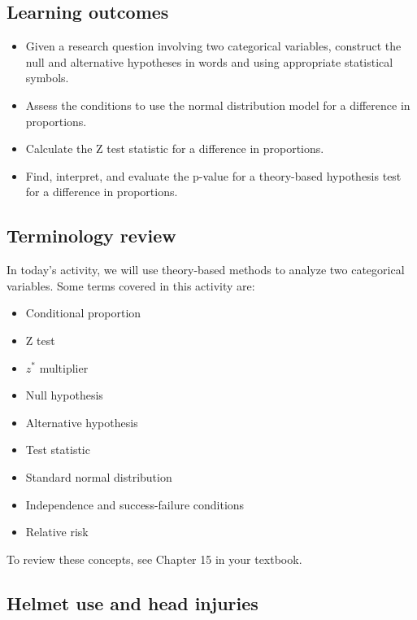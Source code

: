 \documentclass[
]{report}
\begin{document}

\hypertarget{learning-outcomes-17}{%
\subsection{Learning outcomes}\label{learning-outcomes-17}}

\begin{itemize}
\item
  Given a research question involving two categorical variables, construct the null and alternative hypotheses
  in words and using appropriate statistical symbols.
\item
  Assess the conditions to use the normal distribution model for a difference in proportions.
\item
  Calculate the Z test statistic for a difference in proportions.
\item
  Find, interpret, and evaluate the p-value for a theory-based hypothesis test for a difference in proportions.
\end{itemize}

\hypertarget{terminology-review-15}{%
\subsection{Terminology review}\label{terminology-review-15}}

In today's activity, we will use theory-based methods to analyze two categorical variables. Some terms covered in this activity are:

\begin{itemize}
\item
  Conditional proportion
\item
  Z test
\item
  \(z^*\) multiplier
\item
  Null hypothesis
\item
  Alternative hypothesis
\item
  Test statistic
\item
  Standard normal distribution
\item
  Independence and success-failure conditions
\item
  Relative risk
\end{itemize}

To review these concepts, see Chapter 15 in your textbook.

\hypertarget{helmet-use-and-head-injuries}{%
\subsection{Helmet use and head injuries}\label{helmet-use-and-head-injuries}}
\end{document}

